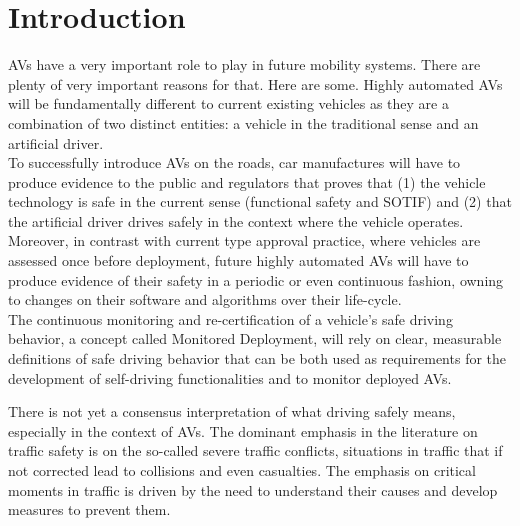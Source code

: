 \section{Introduction}
\label{sec:introduction}


AVs have a very important role to play in future mobility systems. There are plenty of very important reasons for that. Here are some. Highly automated AVs will be fundamentally different to current existing vehicles as they are a combination of two distinct entities: a vehicle in the traditional sense and an artificial driver.\\


To successfully introduce AVs on the roads, car manufactures will have to produce evidence to the public and regulators that proves that (1) the vehicle technology is safe in the current sense (functional safety and SOTIF) and (2) that the artificial driver drives safely in the context where the vehicle operates. Moreover, in contrast with current type approval practice, where vehicles are assessed once before deployment, future highly automated AVs will have to produce evidence of their safety in a periodic or even continuous fashion, owning to changes on their software and algorithms over their life-cycle.\\

The continuous monitoring and re-certification of a vehicle's safe driving behavior, a concept called Monitored Deployment, will rely on clear, measurable definitions of safe driving behavior that can be both used as requirements for the development of self-driving functionalities and to monitor deployed AVs.


There is not yet a consensus interpretation of what driving safely means, especially in the context of AVs. The dominant emphasis in the literature on traffic safety is on the so-called severe traffic conflicts, situations in traffic that if not corrected lead to collisions and even casualties. The emphasis on critical moments in traffic is driven by the need to understand their causes and develop measures to prevent them. \\

